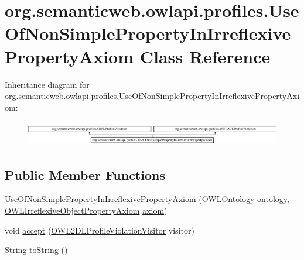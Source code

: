 \hypertarget{classorg_1_1semanticweb_1_1owlapi_1_1profiles_1_1_use_of_non_simple_property_in_irreflexive_property_axiom}{\section{org.\-semanticweb.\-owlapi.\-profiles.\-Use\-Of\-Non\-Simple\-Property\-In\-Irreflexive\-Property\-Axiom Class Reference}
\label{classorg_1_1semanticweb_1_1owlapi_1_1profiles_1_1_use_of_non_simple_property_in_irreflexive_property_axiom}
}
Inheritance diagram for org.\-semanticweb.\-owlapi.\-profiles.\-Use\-Of\-Non\-Simple\-Property\-In\-Irreflexive\-Property\-Axiom\-:\begin{figure}[H]
\begin{center}
\leavevmode
\includegraphics[height=1.122244cm]{classorg_1_1semanticweb_1_1owlapi_1_1profiles_1_1_use_of_non_simple_property_in_irreflexive_property_axiom}
\end{center}
\end{figure}
\subsection*{Public Member Functions}
\begin{DoxyCompactItemize}
\item 
\hyperlink{classorg_1_1semanticweb_1_1owlapi_1_1profiles_1_1_use_of_non_simple_property_in_irreflexive_property_axiom_ab92b0e747ec4fbb7cf659244cba90acb}{Use\-Of\-Non\-Simple\-Property\-In\-Irreflexive\-Property\-Axiom} (\hyperlink{interfaceorg_1_1semanticweb_1_1owlapi_1_1model_1_1_o_w_l_ontology}{O\-W\-L\-Ontology} ontology, \hyperlink{interfaceorg_1_1semanticweb_1_1owlapi_1_1model_1_1_o_w_l_irreflexive_object_property_axiom}{O\-W\-L\-Irreflexive\-Object\-Property\-Axiom} \hyperlink{classorg_1_1semanticweb_1_1owlapi_1_1profiles_1_1_o_w_l_profile_violation_aa7c8e8910ed3966f64a2c003fb516214}{axiom})
\item 
void \hyperlink{classorg_1_1semanticweb_1_1owlapi_1_1profiles_1_1_use_of_non_simple_property_in_irreflexive_property_axiom_a3db9b216a1ead16f3b18efb583c79a3c}{accept} (\hyperlink{interfaceorg_1_1semanticweb_1_1owlapi_1_1profiles_1_1_o_w_l2_d_l_profile_violation_visitor}{O\-W\-L2\-D\-L\-Profile\-Violation\-Visitor} visitor)
\item 
String \hyperlink{classorg_1_1semanticweb_1_1owlapi_1_1profiles_1_1_use_of_non_simple_property_in_irreflexive_property_axiom_a1c3d563b63191b03867ada439082c688}{to\-String} ()
\end{DoxyCompactItemize}


